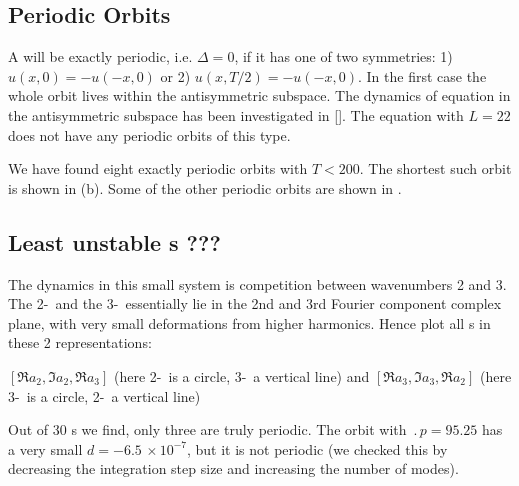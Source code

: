\subsection{Periodic Orbits}
A \rpo will be exactly periodic, i.e. $\Delta = 0$, if it has one of
two symmetries: 1) $u(x,0) = -u(-x,0)$ or 2) $u(x,T/2) = -u(-x,0)$.
In the first case the whole orbit lives within the antisymmetric
subspace. The dynamics of \KS equation in the antisymmetric subspace
has been investigated in []. The \KS
equation with $L = 22$ does not have any periodic orbits of this
type. %

We have found eight exactly periodic orbits with $T < 200$.  The
shortest such orbit is shown in (b).  Some
of the other periodic orbits are shown in .


\subsection{Least unstable \rpo s ???}

The dynamics in this small system is competition between wavenumbers
2 and 3. The 2-\eqv\  and the 3-\eqv\  essentially lie in
the 2nd and 3rd Fourier component complex plane, with very
small deformations from higher harmonics.
Hence plot all \rpo s in these 2 representations:

$[ \Re a_2, \Im a_2, \Re a_3 ]$
(here 2-\eqv\  is a circle, 3-\eqv\ a vertical line)
 and
$[ \Re a_3, \Im a_3, \Re a_2 ]$
(here 3-\eqv\ is a circle, 2-\eqv\ a vertical line)

%
Out of 30 \rpo s we
find,  only three are truly periodic.  The orbit
with $\period{p} = 95.25$ has a very small
$d = -6.5\,\times 10^{-7}$, but it is not periodic
(we
checked this by decreasing the integration step size and increasing the
number of modes).


